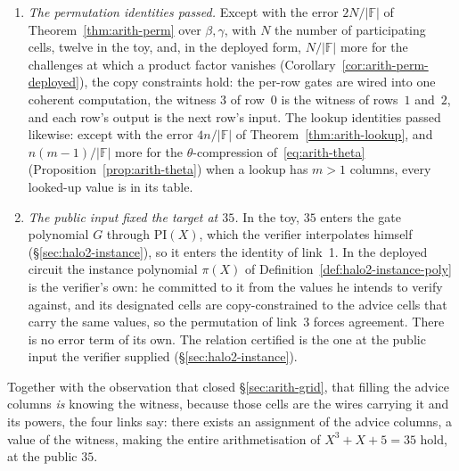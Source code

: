 \documentclass[11pt,a4paper]{article}
\theoremstyle{definition}
\newcommand{\F}{\mathbb{F}}
\begin{document}
\begin{enumerate}[leftmargin=*, itemsep=3pt]
  every row (Theorem~\ref{thm:arith-gate-vanish}). Both steps are exact
  equivalences with no error term: in the toy, the four rows of
  Table~\ref{tab:arith-trace} each satisfy~\eqref{eq:arith-gate}. In
  the deployed form every constraint polynomial combined into $C$
  vanishes on the active rows: every custom gate, and the permutation
  and lookup identities that the next two links consume.
\item \emph{The permutation identities passed.} Except with the error
  $2N/|\F|$ of Theorem~\ref{thm:arith-perm} over $\beta, \gamma$, with
  $N$ the number of participating cells, twelve in the toy, and, in the
  deployed form, $N/|\F|$ more for the challenges at which a product
  factor vanishes (Corollary~\ref{cor:arith-perm-deployed}),
  the copy constraints hold: the
  per-row gates are wired into one coherent computation, the witness
  $3$ of row~$0$ is the witness of rows~$1$ and~$2$, and each row's
  output is the next row's input. The lookup identities passed likewise:
  except with the error $4n/|\F|$ of Theorem~\ref{thm:arith-lookup}, and
  $n(m - 1)/|\F|$ more for the $\theta$-compression
  of~\eqref{eq:arith-theta} (Proposition~\ref{prop:arith-theta}) when a
  lookup has $m > 1$ columns, every looked-up value is in its table.
\item \emph{The public input fixed the target at $35$.} In the toy,
  $35$ enters the gate polynomial $G$ through $\mathrm{PI}(X)$, which the
  verifier interpolates himself (\S\ref{sec:halo2-instance}), so it
  enters the identity of link~1. In the deployed circuit the instance
  polynomial $\pi(X)$ of Definition~\ref{def:halo2-instance-poly} is
  the verifier's own: he committed to it from the values he intends to
  verify against, and its designated cells are copy-constrained to the
  advice cells that carry the same values, so the permutation of
  link~3 forces agreement. There is no error term of its own. The
  relation certified is the one at the public input the verifier
  supplied (\S\ref{sec:halo2-instance}).
\end{enumerate}
Together with the observation that closed \S\ref{sec:arith-grid}, that
filling the advice columns \emph{is} knowing the witness, because those cells
are the wires carrying it and its powers, the four links say: there
exists an assignment of the advice columns, a value of the witness, making the
entire arithmetisation of $X^3 + X + 5 = 35$ hold, at the public $35$.
\end{document}
